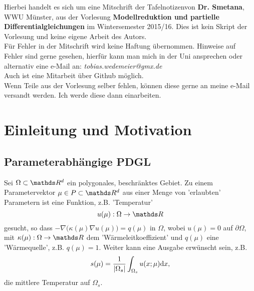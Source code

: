 

\newcommand{\vorlesung}{Modellreduktion und partielle Differentialgleichungen}
\newcommand{\Prof}{Dr. Smetana}
\newcommand{\subt}{Mitschrift der Tafelnotizen}






\maketitle
\thispagestyle{empty}
\cleardoubleoddemptypage

\thispagestyle{empty}
\vspace*{\fill}
\begin{center}
	Hierbei handelt es sich um eine \subt von \textbf{\Prof}, WWU Münster, aus der Vorlesung \textbf{\vorlesung} im Wintersemester 2015/16. 
	Dies ist kein Skript der Vorlesung und keine eigene Arbeit des Autors.\\
	\vspace{2cm}
	Für Fehler in der Mitschrift wird keine Haftung übernommen. 
	Hinweise auf Fehler sind gerne gesehen, hierfür kann man mich in der Uni ansprechen oder alternativ eine e-Mail an: \textit{tobias.wedemeier@gmx.de}\\
	Auch ist eine Mitarbeit über Github möglich.\\
	\vspace{2cm}
	Wenn Teile aus der Vorlesung selber fehlen, können diese gerne an meine e-Mail versandt werden. 
	Ich werde diese dann einarbeiten.\\
\end{center}
\vspace*{\fill}
\cleardoubleoddemptypage


\tableofcontents
\cleardoubleoddemptypage %

\section{Einleitung und Motivation}

\subsection{Parameterabhängige PDGL}
\label{sub:para_pdgl}
Sei $\Omega\subset \R^d$ ein polygonales, beschränktes Gebiet. Zu einem Parametervektor $\mu \in P\subset \R^d$ aus einer Menge von 'erlaubten' Parametern ist eine Funktion, z.B. 'Temperatur'
\[
u(\mu): \Omega\to \R
\]
gesucht, so dass $-\nabla\big(\kappa(\mu)\nabla u(\mu)\big) = q(\mu)$ in $\Omega$, wobei $u(\mu) = 0$ auf $\partial\Omega$, mit $\kappa(\mu):\Omega\to \R$ dem 'Wärmeleitkoeffizient' und $q(\mu)$ eine 'Wärmequelle', z.B. $q(\mu)=1$.
Weiter kann eine Ausgabe erwünscht sein, z.B.
\[
s(\mu) = \frac{1}{\left\vert\Omega_s\right\vert} \int_{\Omega_s} u(x;\mu)\mathrm{d} x,
\]
die mittlere Temperatur auf $\Omega_s$.

